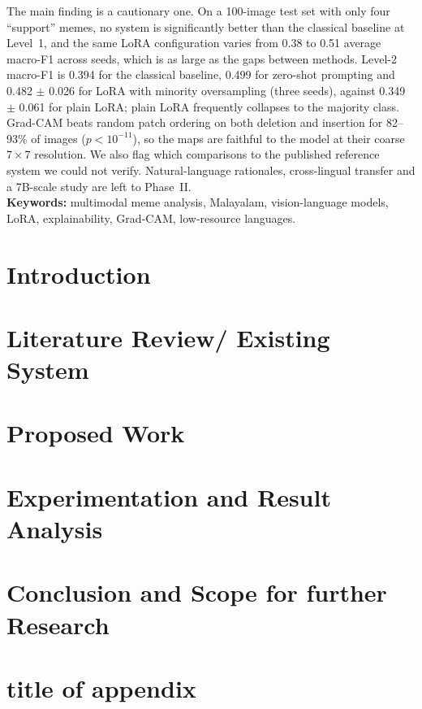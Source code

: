 \documentclass[a4paper, 12pt]{report}
\theoremstyle{definition}
\begin{document}
The main finding is a cautionary one. On a 100-image test set with only four ``support'' memes, no system is significantly better than the classical baseline at Level~1, and the same LoRA configuration varies from 0.38 to 0.51 average macro-F1 across seeds, which is as large as the gaps between methods. Level-2 macro-F1 is 0.394 for the classical baseline, 0.499 for zero-shot prompting and 0.482 $\pm$ 0.026 for LoRA with minority oversampling (three seeds), against 0.349 $\pm$ 0.061 for plain LoRA; plain LoRA frequently collapses to the majority class. Grad-CAM beats random patch ordering on both deletion and insertion for 82--93\% of images ($p<10^{-11}$), so the maps are faithful to the model at their coarse $7\times7$ resolution. We also flag which comparisons to the published reference system we could not verify. Natural-language rationales, cross-lingual transfer and a 7B-scale study are left to Phase~II.\\
\textbf{Keywords:} multimodal meme analysis, Malayalam, vision-language models, LoRA, explainability, Grad-CAM, low-resource languages.\\

\clearpage
{}
\setcounter{page}{1}
\chapter{Introduction}

\chapter{Literature Review/ Existing System}

\chapter{Proposed Work}

\chapter{Experimentation and Result Analysis}
 
\chapter{Conclusion and Scope for further Research}

\appendix
\chapter{title of appendix}


\newpage
\renewcommand{\bibname}{References}


\end{document}
